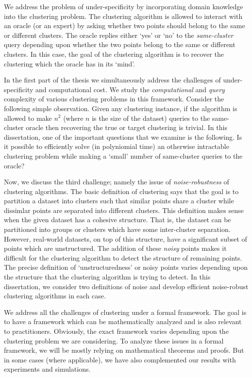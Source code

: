 \documentclass[12pt]{article}
\begin{document}
We address the problem of under-specificity by incorporating domain knowledge into the clustering problem. The clustering algorithm is allowed to interact with an oracle (or an expert) by asking whether two points should belong to the same or different clusters. The oracle replies either `yes' or `no' to the \textit{same-cluster} query depending upon whether the two points belong to the same or different clusters. In this case, the goal of the clustering algorithm is to recover the clustering which the oracle has in its `mind'.

In the first part of the thesis we simultaneously address the challenges of under-specificity and computational cost. We study the \textit{computational} and \textit{query} complexity of various clustering problems in this framework. Consider the following simple observation. Given any clustering instance, if the algorithm is allowed to make $n^2$ (where $n$ is the size of the dataset) queries to the same-cluster oracle then recovering the true or target clustering is trivial. In this dissertation, one of the important questions that we examine is the following. {Is it possible to efficiently solve (in polyniomial time) an otherwise intractable clustering problem while making a `small' number of same-cluster queries to the oracle?}  

Now, we discuss the third challenge; namely the issue of \textit{noise-robustness} of clustering algorithms. The basic definition of clustering says that the goal is to partition a dataset into clusters such that similar points share a cluster while dissimlar points are separated into different clusters. This definition makes sense when the given dataset has a cohesive structure. That is, the dataset can be partitioned into groups or clusters which have some inter-cluster separation. However, real-world datasets, on top of this structure, have a significant subset of points which are unstructured. The addition of these \textit{noisy} points makes it difficult for the clustering algorithm to detect the structure of remaining points. The precise definition of `unstructuredness' or noisy points varies depending upon the structure that the clustering algorithm is trying to detect. In this dissertation, we consider two definitions of noise and develop efficient noise-robust clustering algorithms in each case.

We address all the challenges of clustering under a formal framework. The goal is to have a framework which can be mathematically analyzed and is also relevant to practitioners. Obviously, the exact framework varies depending upon the clustering problem we are considering. To analyze these issues in a formal framework, we will be mostly relying on mathematical theorems and proofs. But in some cases (where applicable), we have also complemented our results with experiments and simulations. 
\end{document}
